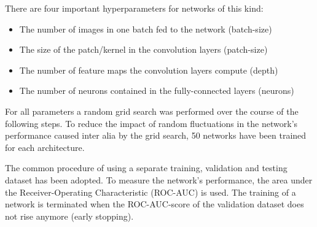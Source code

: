 There are four important hyperparameters for networks of this kind:

\begin{itemize}
\item The number of images in one batch fed to the network (batch-size)
\item The size of the patch/kernel in the convolution layers (patch-size)
\item The number of feature maps the convolution layers compute (depth)
\item The number of neurons contained in the fully-connected layers (neurons)
\end{itemize}

For all parameters a random grid search was performed over the course of the following steps.
To reduce the impact of random fluctuations in the network's performance caused inter alia by the grid search,
\num{50} networks have been trained for each architecture.

The common procedure of using a separate training, validation and testing dataset has been adopted.
To measure the network's performance, the area under the Receiver-Operating Characteristic (ROC-AUC) \cite{roc_auc} is used.
The training of a network is terminated when the ROC-AUC-score of the validation dataset does not rise anymore (early stopping).

